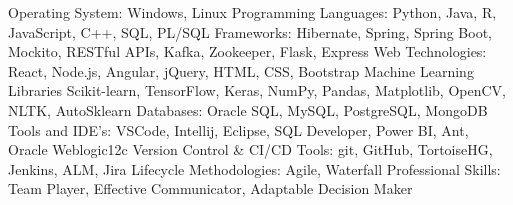 \begin{cvskills}
  \cvskill
    {Operating System:}
    {Windows, Linux}
  \cvskill
    {Programming Languages:}
    {Python, Java, R, JavaScript,  C++, SQL, PL/SQL}
  \cvskill
    {Frameworks:}
    {Hibernate, Spring, Spring Boot, Mockito, RESTful APIs, Kafka, Zookeeper, Flask, Express}
  \cvskill
    {Web Technologies:}
    {React, Node.js, Angular, jQuery, HTML, CSS, Bootstrap}
  \cvskill
    {Machine Learning Libraries}
    {Scikit-learn, TensorFlow, Keras, NumPy, Pandas, Matplotlib, OpenCV, NLTK, AutoSklearn}
  \cvskill
    {Databases:}
    {Oracle SQL, MySQL, PostgreSQL, MongoDB}
  \cvskill
    {Tools and IDE's:}
    {VSCode, Intellij, Eclipse, SQL Developer, Power BI, Ant, Oracle Weblogic12c}
  \cvskill
    {Version Control \& CI/CD Tools:}
    {git, GitHub, TortoiseHG, Jenkins, ALM, Jira}
  \cvskill
    {Lifecycle Methodologies:}
    {Agile, Waterfall}
  \cvskill
    {Professional Skills:}
    {Team Player, Effective Communicator, Adaptable Decision Maker}
\end{cvskills}